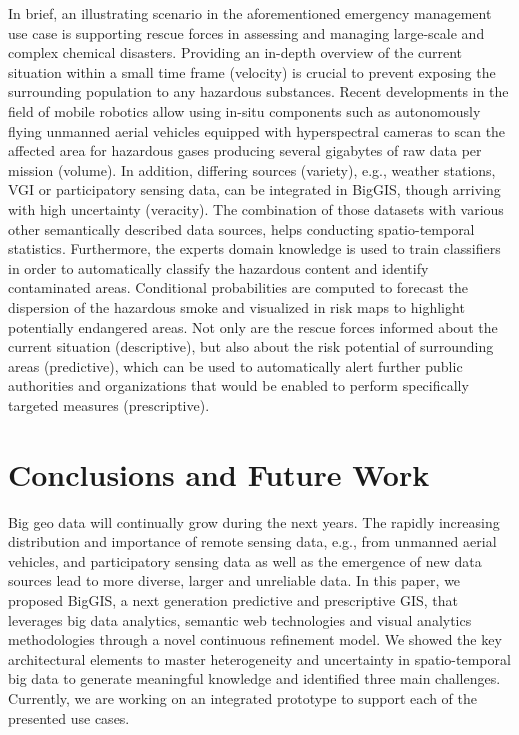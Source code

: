 \documentclass{sig-alternate-05-2015}
\begin{document}
In brief, an illustrating scenario in the aforementioned emergency management
use case is supporting rescue forces in assessing and managing large-scale and
complex chemical disasters. Providing an in-depth overview of the current
situation within a small time frame (velocity) is crucial to prevent exposing
the surrounding population to any hazardous substances. Recent developments in
the field of mobile robotics allow using in-situ components such as
autonomously flying unmanned aerial vehicles equipped with hyperspectral
cameras to scan the affected area for hazardous gases producing several
gigabytes of raw data per mission (volume). In addition, differing sources
(variety), e.g., weather stations, VGI or participatory sensing data, can be
integrated in BigGIS, though arriving with high uncertainty (veracity). The
combination of those datasets with various other semantically described data
sources, helps conducting spatio-temporal statistics. Furthermore, the experts
domain knowledge is used to train classifiers in order to automatically
classify the hazardous content and identify contaminated areas. Conditional
probabilities are computed to forecast the dispersion of the hazardous smoke
and visualized in risk maps to highlight potentially endangered areas. Not only
are the rescue forces informed about the current situation (descriptive), but
also about the risk potential of surrounding areas (predictive), which can be
used to automatically alert further public authorities and organizations that
would be enabled to perform specifically targeted measures (prescriptive).

\section{Conclusions and Future Work}
\label{sec:concl}
Big geo data will continually grow during the next years. The
rapidly increasing distribution and importance of remote sensing data, e.g.,
from unmanned aerial vehicles, and participatory sensing data as well as the
emergence of new data sources lead to more diverse, larger and unreliable data.
In this paper, we proposed BigGIS, a next generation predictive and
prescriptive GIS, that leverages big data analytics, semantic web technologies
and visual analytics methodologies through a novel continuous refinement model.
We showed the key architectural elements to master heterogeneity and
uncertainty in spatio-temporal big data to generate meaningful knowledge and
identified three main challenges. Currently, we are working on an integrated
prototype to support each of the presented use cases.
\end{document}
